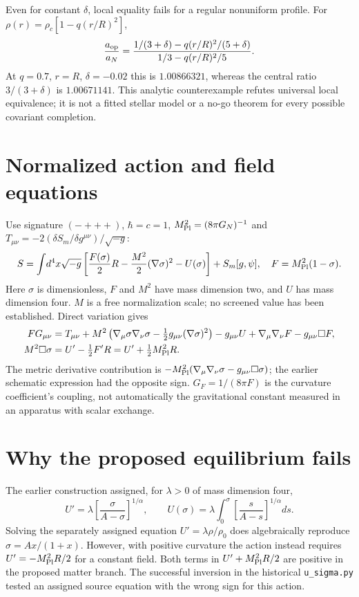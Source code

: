 \documentclass[11pt,a4paper]{article}
\newcommand{\Mpl}{M_{\rm Pl}}
\newcommand{\GN}{G_N}
\begin{document}
Even for constant $\delta$, local equality fails for a regular nonuniform
profile. For $\rho(r)=\rho_c[1-q(r/R)^2]$,
\begin{equation}
 \frac{a_{\rm op}}{a_N}=
 \frac{1/(3+\delta)-q(r/R)^2/(5+\delta)}{1/3-q(r/R)^2/5}.
\end{equation}
At $q=0.7$, $r=R$, $\delta=-0.02$ this is $1.00866321$, whereas the
central ratio $3/(3+\delta)$ is $1.00671141$. This analytic counterexample
refutes universal local equivalence; it is not a fitted stellar model or a
no-go theorem for every possible covariant completion.

\section{Normalized action and field equations}
Use signature $(-+++)$, $\hbar=c=1$, $\Mpl^2=(8\pi\GN)^{-1}$ and
$T_{\mu\nu}=-2(\delta S_m/\delta g^{\mu\nu})/\sqrt{-g}$:
\begin{equation}
 S=\int\!d^4x\sqrt{-g}\left[\frac{F(\sigma)}2R
 -\frac{M^2}2(\nabla\sigma)^2-U(\sigma)\right]+S_m[g,\psi],
 \quad F=\Mpl^2(1-\sigma).
\end{equation}
Here $\sigma$ is dimensionless, $F$ and $M^2$ have mass dimension two,
and $U$ has mass dimension four. $M$ is a free normalization scale;
no screened value has been established. Direct variation gives
\begin{align}
 F G_{\mu\nu}&=T_{\mu\nu}+M^2\left(\nabla_\mu\sigma\nabla_\nu\sigma
 -\tfrac12g_{\mu\nu}(\nabla\sigma)^2\right)-g_{\mu\nu}U
 +\nabla_\mu\nabla_\nu F-g_{\mu\nu}\Box F,\\
 M^2\Box\sigma&=U'-\tfrac12F'R=U'+\tfrac12\Mpl^2R.
\end{align}
The metric derivative contribution is
$-\Mpl^2(\nabla_\mu\nabla_\nu\sigma-g_{\mu\nu}\Box\sigma)$;
the earlier schematic expression had the opposite sign. $G_F=1/(8\pi F)$
is the curvature coefficient's coupling, not automatically the gravitational
constant measured in an apparatus with scalar exchange.

\section{Why the proposed equilibrium fails}
The earlier construction assigned, for $\lambda>0$ of mass dimension four,
\begin{equation}
 U'=\lambda\left[\frac{\sigma}{A-\sigma}\right]^{1/\alpha},\qquad
 U(\sigma)=\lambda\int_0^\sigma
 \left[\frac{s}{A-s}\right]^{1/\alpha}ds.
\end{equation}
Solving the separately assigned equation $U'=\lambda\rho/\rho_0$ does
algebraically reproduce $\sigma=Ax/(1+x)$. However, with positive curvature
the action instead requires $U'=-\Mpl^2R/2$ for a constant field. Both
terms in $U'+\Mpl^2R/2$ are positive in the proposed matter branch.
The successful inversion in the historical \texttt{u\_sigma.py} tested an
assigned source equation with the wrong sign for this action.
\end{document}

